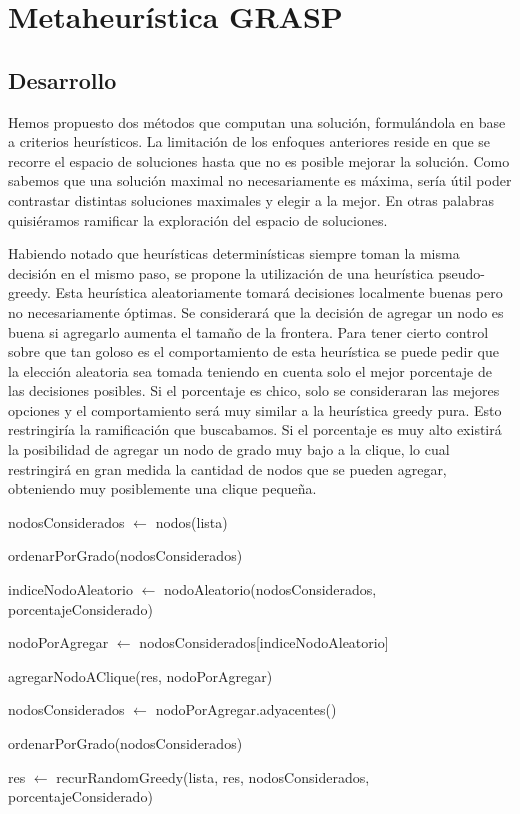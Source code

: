 \section{Metaheurística GRASP}
	\subsection{Desarrollo}
Hemos propuesto dos métodos que computan una solución, formulándola en base a criterios heurísticos. La limitación de los enfoques anteriores reside en que se recorre el espacio de soluciones hasta que no es posible mejorar la solución. Como sabemos que una solución maximal no necesariamente es máxima, sería útil poder contrastar distintas soluciones maximales y elegir a la mejor. En otras palabras quisiéramos ramificar la exploración del espacio de soluciones.

Habiendo notado que heurísticas determinísticas siempre toman la misma decisión en el mismo paso, se propone la utilización de una heurística pseudo-greedy. Esta heurística aleatoriamente tomará decisiones localmente buenas pero no necesariamente óptimas. Se considerará que la decisión de agregar un nodo es buena si agregarlo aumenta el tamaño de la frontera. Para tener cierto control sobre que tan goloso es el comportamiento de esta heurística se puede pedir que la elección aleatoria sea tomada teniendo en cuenta solo el mejor porcentaje de las decisiones posibles. Si el porcentaje es chico, solo se consideraran las mejores opciones y el comportamiento será muy similar a la heurística greedy pura. Esto restringiría la ramificación que buscabamos. Si el porcentaje es muy alto existirá la posibilidad de agregar un nodo de grado muy bajo a la clique, lo cual restringirá en gran medida la cantidad de nodos que se pueden agregar, obteniendo muy posiblemente una clique pequeña. 


\begin{algorithm}[H]
	\NoCaptionOfAlgo
	\caption{}
	
	nodosConsiderados $\leftarrow$ nodos(lista)
	
	ordenarPorGrado(nodosConsiderados)
	
	indiceNodoAleatorio $\leftarrow$ nodoAleatorio(nodosConsiderados, porcentajeConsiderado)
	
	nodoPorAgregar $\leftarrow$ nodosConsiderados[indiceNodoAleatorio]
	
	agregarNodoAClique(res, nodoPorAgregar)
	
	nodosConsiderados $\leftarrow$ nodoPorAgregar.adyacentes()

	ordenarPorGrado(nodosConsiderados)
	
	res $\leftarrow$ recurRandomGreedy(lista, res, nodosConsiderados, porcentajeConsiderado)


\end{algorithm}


